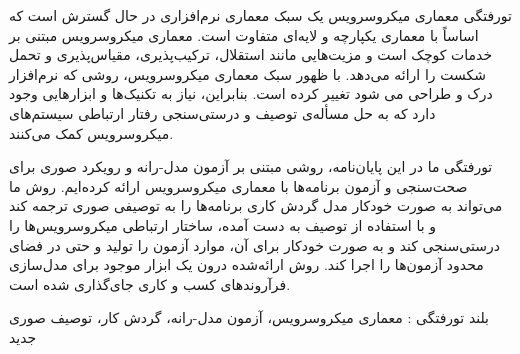 


‌تورفتگی
معماری میکروسرویس یک سبک معماری نرم‌افزاری در حال گسترش است که اساساً با معماری یکپارچه و لایه‌ای متفاوت است. معماری میکروسرویس مبتنی بر خدمات کوچک است و مزیت‌هایی مانند استقلال، ترکیب‌پذیری، مقیاس‌پذیری و تحمل شکست را ارائه می‌دهد. با ظهور سبک معماری میکروسرویس، روشی که نرم‌افزار درک و طراحی می شود تغییر کرده است. بنابراین، نیاز به تکنیک‌ها و ابزارهایی وجود دارد که به حل مسأله‌ی توصیف و درستی‌سنجی رفتار ارتباطی سیستم‌های میکروسرویس کمک می‌کنند. 

‌تورفتگی
ما در این پایان‌نامه، روشی مبتنی بر آزمون مدل-رانه و رویکرد صوری برای صحت‌سنجی و آزمون برنامه‌ها با معماری میکروسرویس ارائه کرده‌ایم. روش ما می‌تواند به صورت خودکار مدل گردش کاری برنامه‌ها را به توصیفی صوری ترجمه کند و با استفاده از توصیف به دست آمده، ساختار ارتباطی میکروسرویس‌ها را درستی‌سنجی کند و به صورت خودکار برای آن، موارد آزمون را تولید و حتی در فضای محدود آزمون‌ها را اجرا کند. روش ارائه‌شده‌ درون یک ابزار موجود برای مدل‌سازی فرآروندهای کسب و کاری جای‌گذاری شده است.



‌بلند
‌تورفتگی : 
معماری میکروسرویس، آزمون مدل-رانه، گردش کار، توصیف صوری
‌جدید
